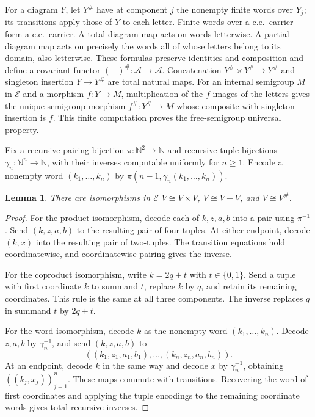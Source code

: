 \documentclass[11pt]{article}
\newtheorem{lemma}[theorem]{Lemma}
\newcommand{\N}{\mathbb N}
\begin{document}
For a diagram $Y$, let $Y^\#$ have at component $j$ the
nonempty finite words over $Y_j$; its transitions apply those
of $Y$ to each letter. Finite words over a c.e.\ carrier form
a c.e.\ carrier. A total diagram map acts on words letterwise.
A partial diagram map acts on precisely the words all of whose
letters belong to its domain, also letterwise. These formulas
preserve identities and composition and define a covariant functor
$(-)^\#:\mathcal A\to\mathcal A$. Concatenation
$Y^\#\times Y^\#\to Y^\#$ and singleton insertion
$Y\to Y^\#$ are total natural maps. For an internal semigroup $M$
in $\mathcal E$ and a morphism $f:Y\to M$, multiplication of the
$f$-images of the letters gives the unique semigroup morphism
$f^\#:Y^\#\to M$ whose composite with singleton insertion is $f$.
This finite computation proves the free-semigroup universal property.

Fix a recursive pairing bijection
$\pi:\N^2\to\N$ and recursive tuple bijections
$\gamma_n:\N^n\to\N$, with their inverses computable uniformly
for $n\ge1$. Encode a nonempty word $(k_1,\ldots,k_n)$ by
$\pi(n-1,\gamma_n(k_1,\ldots,k_n))$.

\begin{lemma}\label{lem:fork-frames}
There are isomorphisms in $\mathcal E$
$V\cong V\times V$, $V\cong V+V$, and $V\cong V^\#$.
\end{lemma}
\begin{proof}
For the product isomorphism, decode each of $k,z,a,b$ into a
pair using $\pi^{-1}$. Send $(k,z,a,b)$ to the resulting pair
of four-tuples. At either endpoint, decode $(k,x)$ into the
resulting pair of two-tuples. The transition equations hold
coordinatewise, and coordinatewise pairing gives the inverse.

For the coproduct isomorphism, write $k=2q+t$ with
$t\in\{0,1\}$. Send a tuple with first coordinate $k$ to
summand $t$, replace $k$ by $q$, and retain its remaining
coordinates. This rule is the same at all three components.
The inverse replaces $q$ in summand $t$ by $2q+t$.

For the word isomorphism, decode $k$ as the nonempty word
$(k_1,\ldots,k_n)$. Decode $z,a,b$ by $\gamma_n^{-1}$,
and send $(k,z,a,b)$ to
\[
 ((k_1,z_1,a_1,b_1),\ldots,(k_n,z_n,a_n,b_n)).
\]
At an endpoint, decode $k$ in the same way and decode $x$
by $\gamma_n^{-1}$, obtaining $((k_j,x_j))_{j=1}^n$.
These maps commute with transitions. Recovering the word of
first coordinates and applying the tuple encodings to the
remaining coordinate words gives total recursive inverses.
\end{proof}
\end{document}
